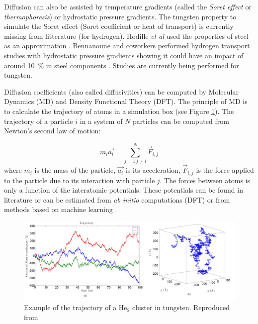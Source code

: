 Diffusion can also be assisted by temperature gradients (called the \textit{Soret effect} or \textit{thermophoresis})  or hydrostatic pressure gradients.
The tungsten property to simulate the Soret effect (Soret coefficient or heat of transport) is currently missing from litterature (for hydrogen).
Hodille \textit{et al} used the properties of steel as an approximation \cite{hodille_estimation_2017}.
Bennanoune and coworkers performed hydrogen transport studies with hydrostatic pressure gradients showing it could have an impact of around \SI{10}{\%} in steel components .
Studies are currently being performed for tungsten.

Diffusion coefficients (also called diffusivities) can be computed by Molecular Dynamics (MD) and Density Functional Theory (DFT).
The principle of MD is to calculate the trajectory of atoms in a simulation box (see Figure \ref{fig: md faney}).
The trajectory of a particle $i$ in a system of $N$ particles can be computed from Newton's second law of motion:

\begin{equation}
    m_i \vec{a_i} = \sum_{j=1 \, j \neq i}^N \vec{F}_{i,j}
\end{equation}
where $m_i$ is the mass of the particle, $\vec{a_i}$ is its acceleration, $\vec{F}_{i,j}$ is the force applied to the particle due to its interaction with particle $j$.
The forces between atoms is only a function of the interatomic potentials.
These potentials can be found in literature or can be estimated from \textit{ab initio} computations (DFT)  or from methods based on machine learning .

\begin{figure}
    \centering
    \includegraphics[width=\linewidth]{Figures/Chapter1/faney_md.jpg}
    \caption{Example of the trajectory of a He$_2$ cluster in tungsten. Reproduced from \cite{faney_numerical_2013}}
    \label{fig: md faney}
\end{figure}

